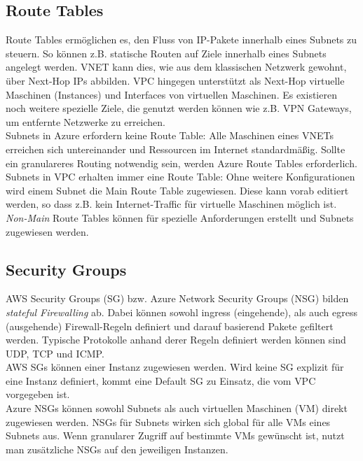 \subsection{Route Tables}
Route Tables ermöglichen es, den Fluss von IP-Pakete innerhalb eines Subnets zu steuern. So können z.B. statische Routen auf Ziele innerhalb eines Subnets angelegt werden. \gls{VNET} kann dies, wie aus dem klassischen Netzwerk gewohnt, über Next-Hop IPs abbilden. \gls{VPC} hingegen unterstützt als Next-Hop virtuelle Maschinen (Instances) und Interfaces von virtuellen Maschinen. Es existieren noch weitere spezielle Ziele, die genutzt werden können wie z.B. \gls{VPN} Gateways, um entfernte Netzwerke zu erreichen.\\
Subnets in Azure erfordern keine Route Table: Alle Maschinen eines \gls{VNET}s erreichen sich untereinander und Ressourcen im Internet standardmäßig. Sollte ein granulareres Routing notwendig sein, werden Azure Route Tables erforderlich.\\
Subnets in \gls{VPC} erhalten immer eine Route Table: Ohne weitere Konfigurationen wird einem Subnet die Main Route Table zugewiesen. Diese kann vorab editiert werden, so dass z.B. kein Internet-Traffic für virtuelle Maschinen möglich ist. \textit{Non-Main} Route Tables können für spezielle Anforderungen erstellt und Subnets zugewiesen werden.

\subsection{Security Groups}
AWS Security Groups (SG) bzw. Azure Network Security Groups (\gls{NSG}) bilden \textit{stateful Firewalling} ab\cite{wool2006packet}. Dabei können sowohl ingress (eingehende), als auch egress (ausgehende) Firewall-Regeln definiert und darauf basierend Pakete gefiltert werden. Typische Protokolle anhand derer Regeln definiert werden können sind \gls{UDP}, \gls{TCP} und \gls{ICMP}.\\
AWS \gls{SG}s können einer Instanz zugewiesen werden. Wird keine \gls{SG} explizit für eine Instanz definiert, kommt eine Default \gls{SG} zu Einsatz, die vom \gls{VPC} vorgegeben ist.\\
Azure \gls{NSG}s können sowohl Subnets als auch virtuellen Maschinen (\gls{VM}) direkt zugewiesen werden. \gls{NSG}s für Subnets wirken sich global für alle \gls{VM}s eines Subnets aus. Wenn granularer Zugriff auf bestimmte \gls{VM}s gewünscht ist, nutzt man zusätzliche \gls{NSG}s \glqq auf\grqq{} den jeweiligen Instanzen.

